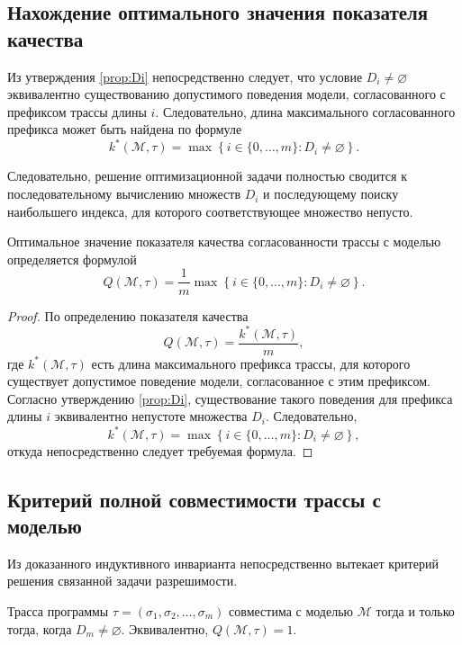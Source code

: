 \subsection{Нахождение оптимального значения показателя качества}

Из утверждения \ref{prop:Di} непосредственно следует, что условие $D_i \neq
\varnothing$ эквивалентно существованию допустимого поведения модели,
согласованного с префиксом трассы длины $i$. Следовательно, длина максимального
согласованного префикса может быть найдена по формуле
\begin{equation}\label{f16}
k^*(\mathcal{M},\tau)
=
\max
\left\{
i \in \{0,\dots,m\} : D_i \neq \varnothing
\right\}.
\end{equation}

Следовательно, решение оптимизационной задачи полностью сводится к
последовательному вычислению множеств $D_i$ и последующему поиску наибольшего
индекса, для которого соответствующее множество непусто.

\begin{theorem}\label{th:Q}
Оптимальное значение показателя качества согласованности трассы с моделью
определяется формулой
\[
Q(\mathcal{M},\tau)
=
\frac{1}{m}
\max
\left\{
i \in \{0,\dots,m\} : D_i \neq \varnothing
\right\}.
\]
\end{theorem}

\begin{proof}
По определению показателя качества
\[
Q(\mathcal{M},\tau)=\frac{k^*(\mathcal{M},\tau)}{m},
\]
где $k^*(\mathcal{M},\tau)$ есть длина максимального префикса трассы, для
которого существует допустимое поведение модели, согласованное с этим
префиксом. Согласно утверждению \ref{prop:Di}, существование такого поведения
для префикса длины $i$ эквивалентно непустоте множества $D_i$. Следовательно,
\[
k^*(\mathcal{M},\tau)
=
\max
\left\{
i \in \{0,\dots,m\} : D_i \neq \varnothing
\right\},
\]
откуда непосредственно следует требуемая формула.
\end{proof}

\subsection{Критерий полной совместимости трассы с моделью}

Из доказанного индуктивного инварианта непосредственно вытекает критерий
решения связанной задачи разрешимости.

\begin{theorem}\label{th:decision}
Трасса программы $\tau = (\sigma_1,\sigma_2,\dots,\sigma_m)$ совместима с
моделью $\mathcal{M}$ тогда и только тогда, когда $D_m \neq \varnothing$.
Эквивалентно, $Q(\mathcal{M},\tau)=1$.
\end{theorem}

